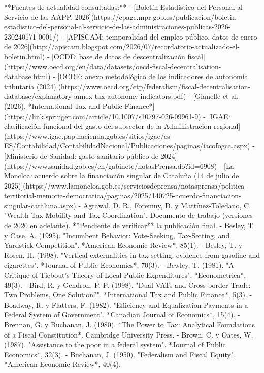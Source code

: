 \documentclass[10pt,a4paper]{article}
\newcounter{anexo}
\begin{document}
{**Fuentes de actualidad consultadas:**
- [Boletín Estadístico del Personal al Servicio de las AAPP, 2026](https://cpage.mpr.gob.es/publicacion/boletin-estadistico-del-personal-al-servicio-de-las-administraciones-publicas-2026-230240171-0001/)
- [APISCAM: temporalidad del empleo público, datos de enero de 2026](http://apiscam.blogspot.com/2026/07/recordatorio-actualizado-el-boletin.html)
- [OCDE: base de datos de descentralización fiscal](https://www.oecd.org/en/data/datasets/oecd-fiscal-decentralisation-database.html)
- [OCDE: anexo metodológico de los indicadores de autonomía tributaria (2024)](https://www.oecd.org/ctp/federalism/fiscal-decentralisation-database/explanatory-annex-tax-autonomy-indicators.pdf)
- [Gianelle et al. (2026), *International Tax and Public Finance*](https://link.springer.com/article/10.1007/s10797-026-09961-9)
- [IGAE: clasificación funcional del gasto del subsector de la Administración regional](https://www.igae.pap.hacienda.gob.es/sitios/igae/es-ES/Contabilidad/ContabilidadNacional/Publicaciones/paginas/iacofogca.aspx)
- [Ministerio de Sanidad: gasto sanitario público de 2024](https://www.sanidad.gob.es/en/gabinete/notasPrensa.do?id=6908)
- [La Moncloa: acuerdo sobre la financiación singular de Cataluña (14 de julio de 2025)](https://www.lamoncloa.gob.es/serviciosdeprensa/notasprensa/politica-territorial-memoria-democratica/paginas/2025/140725-acuerdo-financiacion-singular-cataluna.aspx)
- Agrawal, D. R., Foremny, D. y Martínez-Toledano, C. "Wealth Tax Mobility and Tax Coordination". Documento de trabajo (versiones de 2020 en adelante). **Pendiente de verificar** la publicación final.
- Besley, T. y Case, A. (1995). "Incumbent Behavior: Vote-Seeking, Tax-Setting, and Yardstick Competition". *American Economic Review*, 85(1).
- Besley, T. y Rosen, H. (1998). "Vertical externalities in tax setting: evidence from gasoline and cigarettes". *Journal of Public Economics*, 70(3).
- Bewley, T. (1981). "A Critique of Tiebout's Theory of Local Public Expenditures". *Econometrica*, 49(3).
- Bird, R. y Gendron, P.-P. (1998). "Dual VATs and Cross-border Trade: Two Problems, One Solution?". *International Tax and Public Finance*, 5(3).
- Boadway, R. y Flatters, F. (1982). "Efficiency and Equalization Payments in a Federal System of Government". *Canadian Journal of Economics*, 15(4).
- Brennan, G. y Buchanan, J. (1980). *The Power to Tax: Analytical Foundations of a Fiscal Constitution*. Cambridge University Press.
- Brown, C. y Oates, W. (1987). "Assistance to the poor in a federal system". *Journal of Public Economics*, 32(3).
- Buchanan, J. (1950). "Federalism and Fiscal Equity". *American Economic Review*, 40(4).
}
\end{document}
